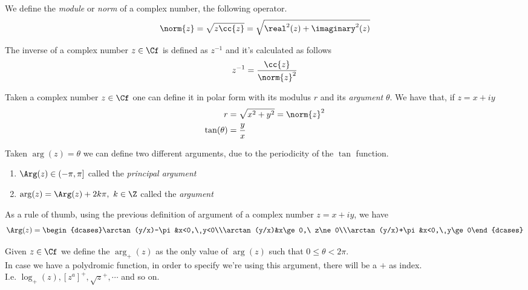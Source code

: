 \documentclass[../mmf.tex]{subfiles}
\begin{document}
\begin{dfn}
	We define the \textit{module} or \textit{norm} of a complex number, the following operator.
	\begin{equation}
		\norm{z}=\sqrt{z\cc{z}}=\sqrt{\real^2{(z)}+\imaginary^2{(z)}}
		\label{eq:normcomplexz}
	\end{equation}
\end{dfn}
\begin{dfn}
	The inverse of a complex number $z\in\Cf$ is defined as $z^{-1}$ and it's calculated as follows
	\begin{equation}
		z^{-1}=\frac{\cc{z}}{\norm{z}^2}
		\label{eq:inversez}
	\end{equation}
\end{dfn}
\begin{dfn}
	Taken a complex number $z\in\Cf$ one can define it in polar form with its modulus $r$ and its \textit{argument} $\theta$. We have that, if $z=x+iy$
	\begin{equation}
		\begin{aligned}
			r&=\sqrt{x^2+y^2}=\norm{z}^2\\
			\tan(\theta)&=\frac{y}{x}
		\end{aligned}
		\label{eq:polar}
	\end{equation}
\end{dfn}
\begin{dfn}
	Taken $\arg(z)=\theta$ we can define two different arguments, due to the periodicity of the $\tan$ function.
	\begin{enumerate}
	\item $\Arg(z)\in(-\pi,\pi]$ called the \textit{principal argument}
	\item $\arg(z)=\Arg(z)+2k\pi,\ k\in\Z$ called the \textit{argument}
	\end{enumerate}
	As a rule of thumb, using the previous definition of argument of a complex number $z=x+iy$, we have
	\begin{equation}
		\Arg(z)=\begin{dcases}\arctan(y/x)-\pi&x<0,\ y<0\\\arctan(y/x)&x\ge0,\ z\ne0\\\arctan(y/x)+\pi&x<0,\ y\ge0\end{dcases}
		\label{eq:princargcalc}
	\end{equation}
\end{dfn}
\begin{dfn}[$\arg_+$]
	Given $z\in\Cf$ we define the $\arg_+(z)$ as the only value of $\arg(z)$ such that $0\le\theta<2\pi$.\\
	In case we have a polydromic function, in order to specify we're using this argument, there will be a $+$ as index.\\
	I.e. $\log_+(z),[z^a]^+,\sqrt{z}^+,\cdots$ and so on.
\end{dfn}
\end{document}
